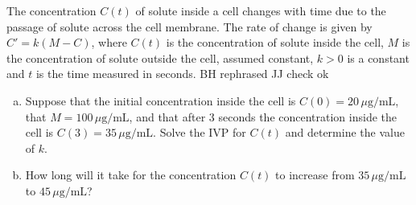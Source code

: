\documentclass[12pt]{book}
\begin{document}


\begin{exercise}
{\color{blue}
The concentration $C(t)$ of solute inside a cell changes with time due to the passage of solute across the cell membrane. The rate of change is given by $C' = k(M - C)$, where $C(t)$ is the concentration of solute inside 
the cell,  $M$ is the concentration of solute outside the cell, assumed constant, $k>0$ is a constant and $t$ is the time measured in seconds.
}
{\color{teal}BH rephrased JJ check ok}
\begin{enumerate}[a)]
    \item Suppose that the initial concentration inside the cell is $C(0)=20\,\mu\text{g/mL}$, that 
    $M = 100\, \mu\text{g/mL}$, and that after 3 seconds the concentration inside the cell is 
    $C(3)=35\, \mu\text{g/mL}$. 
    Solve the IVP for $C(t)$ and determine the value of $k$.
    \item How long will it take for the concentration $C(t)$ to increase from $35\, \mu \text{g/mL}$ to $45\, \mu \text{g/mL}$?
\end{enumerate}

\end{exercise}

\end{document}
